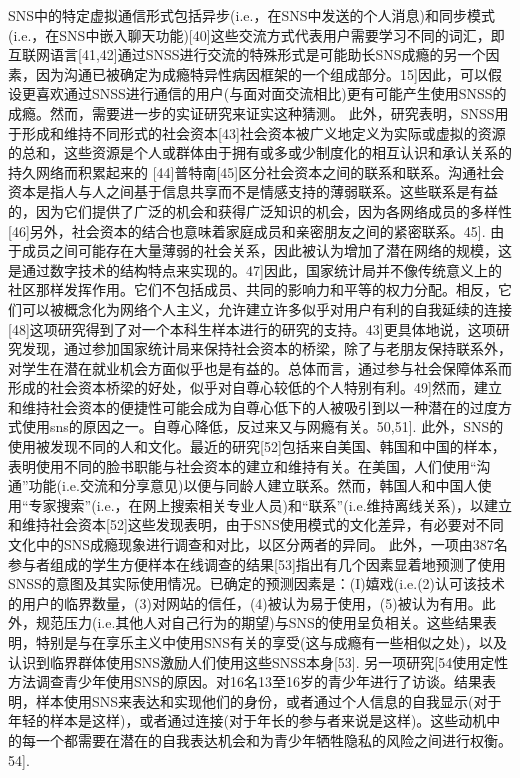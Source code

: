 SNS中的特定虚拟通信形式包括异步(i.e.，在SNS中发送的个人消息)和同步模式(i.e.，在SNS中嵌入聊天功能)[40]这些交流方式代表用户需要学习不同的词汇，即互联网语言[41,42]通过SNSS进行交流的特殊形式是可能助长SNS成瘾的另一个因素，因为沟通已被确定为成瘾特异性病因框架的一个组成部分。15]因此，可以假设更喜欢通过SNSS进行通信的用户(与面对面交流相比)更有可能产生使用SNSS的成瘾。然而，需要进一步的实证研究来证实这种猜测。
此外，研究表明，SNSS用于形成和维持不同形式的社会资本[43]社会资本被广义地定义为实际或虚拟的资源的总和，这些资源是个人或群体由于拥有或多或少制度化的相互认识和承认关系的持久网络而积累起来的 [44]普特南[45]区分社会资本之间的联系和联系。沟通社会资本是指人与人之间基于信息共享而不是情感支持的薄弱联系。这些联系是有益的，因为它们提供了广泛的机会和获得广泛知识的机会，因为各网络成员的多样性[46]另外，社会资本的结合也意味着家庭成员和亲密朋友之间的紧密联系。45].
由于成员之间可能存在大量薄弱的社会关系，因此被认为增加了潜在网络的规模，这是通过数字技术的结构特点来实现的。47]因此，国家统计局并不像传统意义上的社区那样发挥作用。它们不包括成员、共同的影响力和平等的权力分配。相反，它们可以被概念化为网络个人主义，允许建立许多似乎对用户有利的自我延续的连接[48]这项研究得到了对一个本科生样本进行的研究的支持。43]更具体地说，这项研究发现，通过参加国家统计局来保持社会资本的桥梁，除了与老朋友保持联系外，对学生在潜在就业机会方面似乎也是有益的。总体而言，通过参与社会保障体系而形成的社会资本桥梁的好处，似乎对自尊心较低的个人特别有利。49]然而，建立和维持社会资本的便捷性可能会成为自尊心低下的人被吸引到以一种潜在的过度方式使用sns的原因之一。自尊心降低，反过来又与网瘾有关。50,51].
此外，SNS的使用被发现不同的人和文化。最近的研究[52]包括来自美国、韩国和中国的样本，表明使用不同的脸书职能与社会资本的建立和维持有关。在美国，人们使用“沟通”功能(i.e.交流和分享意见)以便与同龄人建立联系。然而，韩国人和中国人使用“专家搜索”(i.e.，在网上搜索相关专业人员)和“联系”(i.e.维持离线关系)，以建立和维持社会资本[52]这些发现表明，由于SNS使用模式的文化差异，有必要对不同文化中的SNS成瘾现象进行调查和对比，以区分两者的异同。
此外，一项由387名参与者组成的学生方便样本在线调查的结果[53]指出有几个因素显着地预测了使用SNSS的意图及其实际使用情况。已确定的预测因素是：(I)嬉戏(i.e.(2)认可该技术的用户的临界数量，(3)对网站的信任，(4)被认为易于使用，(5)被认为有用。此外，规范压力(i.e.其他人对自己行为的期望)与SNS的使用呈负相关。这些结果表明，特别是与在享乐主义中使用SNS有关的享受(这与成瘾有一些相似之处)，以及认识到临界群体使用SNS激励人们使用这些SNSS本身[53].
另一项研究[54使用定性方法调查青少年使用SNS的原因。对16名13至16岁的青少年进行了访谈。结果表明，样本使用SNS来表达和实现他们的身份，或者通过个人信息的自我显示(对于年轻的样本是这样)，或者通过连接(对于年长的参与者来说是这样)。这些动机中的每一个都需要在潜在的自我表达机会和为青少年牺牲隐私的风险之间进行权衡。54].
